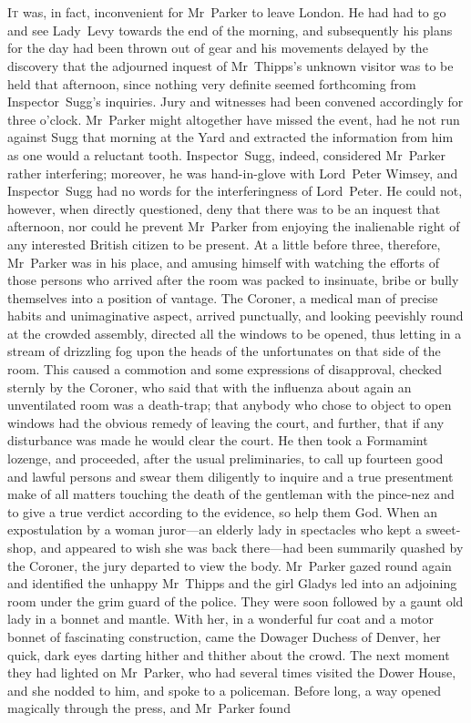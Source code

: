 \chapter[Chapter \thechapter]{}
\lettrine{I}{t} was, in fact, inconvenient for Mr~Parker to leave London. He had had to go and see Lady~Levy towards the end of the morning, and subsequently his plans for the day had been thrown out of gear and his movements delayed by the discovery that the adjourned inquest of Mr~Thipps's unknown visitor was to be held that afternoon, since nothing very definite seemed forthcoming from Inspector~Sugg's inquiries. Jury and witnesses had been convened accordingly for three o'clock. Mr~Parker might altogether have missed the event, had he not run against Sugg that morning at the Yard and extracted the information from him as one would a reluctant tooth. Inspector~Sugg, indeed, considered Mr~Parker rather interfering; moreover, he was hand-in-glove with Lord~Peter Wimsey, and Inspector~Sugg had no words for the interferingness of Lord~Peter. He could not, however, when directly questioned, deny that there was to be an inquest that afternoon, nor could he prevent Mr~Parker from enjoying the inalienable right of any interested British citizen to be present. At a little before three, therefore, Mr~Parker was in his place, and amusing himself with watching the efforts of those persons who arrived after the room was packed to insinuate, bribe or bully themselves into a position of vantage. The Coroner, a medical man of precise habits and unimaginative aspect, arrived punctually, and looking peevishly round at the crowded assembly, directed all the windows to be opened, thus letting in a stream of drizzling fog upon the heads of the unfortunates on that side of the room. This caused a commotion and some expressions of disapproval, checked sternly by the Coroner, who said that with the influenza about again an unventilated room was a death-trap; that anybody who chose to object to open windows had the obvious remedy of leaving the court, and further, that if any disturbance was made he would clear the court. He then took a Formamint lozenge, and proceeded, after the usual preliminaries, to call up fourteen good and lawful persons and swear them diligently to inquire and a true presentment make of all matters touching the death of the gentleman with the pince-nez and to give a true verdict according to the evidence, so help them God. When an expostulation by a woman juror—an elderly lady in spectacles who kept a sweet-shop, and appeared to wish she was back there—had been summarily quashed by the Coroner, the jury departed to view the body. Mr~Parker gazed round again and identified the unhappy Mr~Thipps and the girl Gladys led into an adjoining room under the grim guard of the police. They were soon followed by a gaunt old lady in a bonnet and mantle. With her, in a wonderful fur coat and a motor bonnet of fascinating construction, came the Dowager Duchess of Denver, her quick, dark eyes darting hither and thither about the crowd. The next moment they had lighted on Mr~Parker, who had several times visited the Dower House, and she nodded to him, and spoke to a policeman. Before long, a way opened magically through the press, and Mr~Parker found 